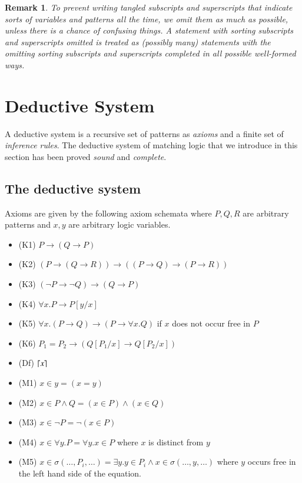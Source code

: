 \documentclass{article}
\theoremstyle{plain}
\newtheorem{rmk}[thm]{Remark}
\DeclarePairedDelimiter\ceil{\lceil}{\rceil}
\begin{document}
\begin{rmk}
	To prevent writing tangled subscripts and superscripts that indicate sorts of variables and patterns all the time, we omit them as much as possible, unless there is a chance of confusing things. A statement with sorting subscripts and superscripts omitted is treated as (possibly many) statements with the omitting sorting subscripts and superscripts completed in all possible well-formed ways.
\end{rmk}

\section{Deductive System}
A deductive system is a recursive set of patterns as \emph{axioms} and a finite set of \emph{inference rules}. The deductive system of matching logic that we introduce in this section has been proved \emph{sound} and \emph{complete}.

\subsection{The deductive system}

Axioms are given by the following axiom schemata where $P, Q, R$ are arbitrary patterns and $x, y$ are arbitrary logic variables.
\begin{itemize}
\item (K1) $P \to (Q \to P)$
\item (K2) $(P \to (Q \to R)) \to ((P \to Q) \to (P \to R))$
\item (K3) $(\neg P \to \neg Q) \to (Q \to P)$
\item (K4) $\forall x . P \to P[y/x]$
\item (K5) $\forall x . (P \to Q) \to (P \to \forall x . Q)$ if $x$ does not occur free in $P$
\item (K6) $P_1 = P_2 \to (Q[P_1/x] \to Q[P_2/x])$
\item (Df)  $\ceil{x}$
\item (M1) $x \in y = (x = y)$
\item (M2) $x \in P \wedge Q = (x \in P) \wedge (x \in Q)$
\item (M3) $x \in \neg P = \neg (x \in P)$
\item (M4) $x \in \forall y . P = \forall y . x \in P$ where $x$ is distinct from $y$
\item (M5) $x \in \sigma(\dots,P_i,\dots) = \exists y . y \in P_i \wedge x \in \sigma(\dots,y,\dots)$ where $y$ occurs free in the left hand side of the equation.
\end{itemize}
\end{document}
